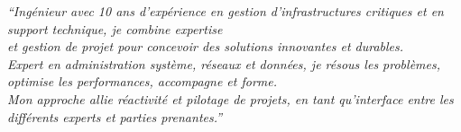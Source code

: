 \documentclass[10pt,a4paper,ragged2e,withhyper,normalphoto]{altacv}
\renewenvironment{quote}{\color{accent}\itshape}{\par}
\begin{document}



\makecvheader


\begin{quote}
``Ingénieur avec 10 ans d’expérience en gestion d’infrastructures critiques et en support technique, je combine expertise \\
et gestion de projet pour concevoir des solutions innovantes et durables. \\
Expert en administration système, réseaux et données, je résous les problèmes, optimise les performances, accompagne et forme. \\
Mon approche allie réactivité et pilotage de projets, en tant qu’interface entre les différents experts et parties prenantes.''
\end{quote}
\end{document}
